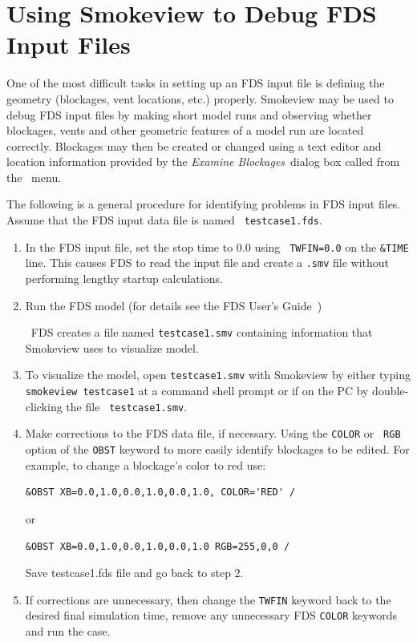 \documentclass[11pt,twoside]{book}
\begin{document}


\chapter{Using Smokeview to Debug FDS Input Files} One of the most difficult
tasks in setting up an FDS input file is defining the geometry
(blockages, vent locations, etc.) properly. Smokeview may be used
to debug FDS input files by making short model runs and observing
whether blockages, vents and other geometric features of a model
run are located correctly. Blockages may then be created or
changed using a text editor and location information provided by
the {\em Examine Blockages}\ dialog box called from the \ menu.

The following is a general procedure for identifying problems in
FDS input files. Assume that the FDS input data file is named {\tt
testcase1.fds}.
\begin{enumerate}
\item In the FDS input file, set the stop time to $0.0$ using {\tt
TWFIN=0.0} on the {\tt \&TIME} line. This causes FDS to read the
input file and create a {\tt .smv} file without  performing
lengthy startup calculations.

\item Run the FDS model (for details see the FDS User's
Guide~\cite{FDS_Users_Guide})

\noindent\ FDS creates a file named {\tt testcase1.smv} containing
information that Smokeview uses to visualize model.

\item To visualize the model, open {\tt testcase1.smv} with
Smokeview by either typing {\tt smokeview testcase1} at a command
shell prompt or if on the PC by double-clicking the file {\tt
testcase1.smv}.

\item Make corrections to the FDS data file, if necessary. Using the {\tt COLOR} or {\tt
RGB} option of the
{\tt OBST} keyword to more easily identify blockages to be edited.
For example, to change a blockage's color to red use:
\begin{lstlisting}
&OBST XB=0.0,1.0,0.0,1.0,0.0,1.0, COLOR='RED' /
\end{lstlisting}
\noindent or
\begin{lstlisting}
&OBST XB=0.0,1.0,0.0,1.0,0.0,1.0 RGB=255,0,0 /
\end{lstlisting}

\noindent Save testcase1.fds file and go back to step 2.

\item If corrections are unnecessary, then change the {\tt TWFIN}
keyword back to the desired final simulation time, remove any
unnecessary FDS {\tt COLOR} keywords and run the case.
\end{enumerate}
\end{document}
